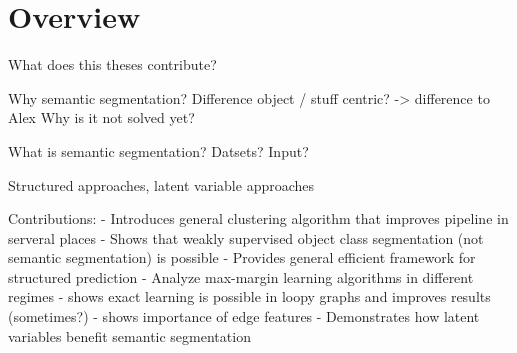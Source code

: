 \chapter{Overview}

What does this theses contribute?

Why semantic segmentation? Difference object / stuff centric? -> difference to Alex
Why is it not solved yet?

What is semantic segmentation?
Datsets? Input?

Structured approaches, latent variable approaches

Contributions:
- Introduces general clustering algorithm that improves pipeline in serveral places
- Shows that weakly supervised object class segmentation (not semantic segmentation) is possible
- Provides general efficient framework for structured prediction
- Analyze max-margin learning algorithms in different regimes
- shows exact learning is possible in loopy graphs and improves results (sometimes?)
- shows importance of edge features
- Demonstrates how latent variables benefit semantic segmentation
